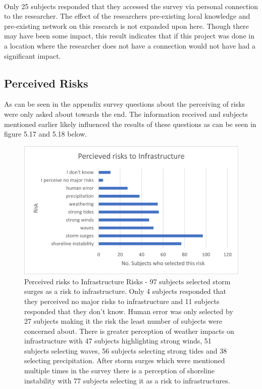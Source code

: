 \paragraph{}

Only 25 subjects responded that they accessed the survey via personal connection to the researcher. The effect of the researchers pre-existing local knowledge and pre-existing network on this research is not expanded upon here. Though there may have been some impact, this result indicates that if this project was done in a location where the researcher does not have a connection would not have had a significant impact. 

\subsection{Perceived Risks}
As can be seen in the appendix survey questions about the perceiving of risks were only asked about towards the end. The information received and subjects mentioned earlier likely influenced the results of these questions as can be seen in figure 5.17 and 5.18 below.

\begin{figure}[h!]
    \centering
    \includegraphics{fig_results/infrastructure-risks.png}
    \caption{Perceived risks to Infrastructure Risks - 97 subjects selected storm surges as a risk to infrastructure. Only 4 subjects responded that they perceived no major risks to infrastructure and 11 subjects responded that they don't know. Human error was only selected by 27 subjects making it the risk the least number of subjects were concerned about. There is greater perception of weather impacts on infrastructure with 47 subjects highlighting strong winds, 51 subjects selecting waves, 56 subjects selecting strong tides and 38 selecting precipitation. After storm surges which were mentioned multiple times in the survey there is a perception of shoreline instability with 77 subjects selecting it as a risk to infrastructures.   }
    \label{fig:my_label}
\end{figure}
